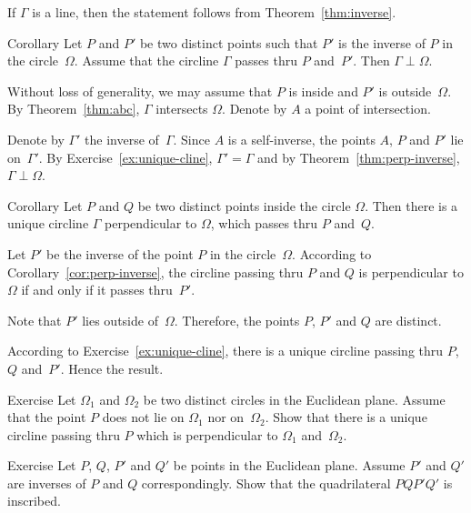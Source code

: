 If $\Gamma$ is a line, 
then the statement follows from Theorem~\ref{thm:inverse}.
\qeds


\begin{thm}{Corollary}\label{cor:perp-inverse}
Let $P$ and $P'$ be two distinct points
such that $P'$ is the inverse of $P$ in the circle~$\Omega$.
Assume that the circline $\Gamma$ passes thru $P$ and~$P'$.
Then $\Gamma\perp\Omega$.
\end{thm}

Without loss of generality, we may assume that $P$ is inside and $P'$ is outside~$\Omega$.
By Theorem~\ref{thm:abc}, $\Gamma$ intersects $\Omega$.
Denote by $A$ a point of intersection.


Denote by $\Gamma'$ the inverse of~$\Gamma$.
Since $A$ is a self-inverse, the points $A$, $P$ and $P'$ lie on~$\Gamma'$.
By Exercise~\ref{ex:unique-cline},
$\Gamma'=\Gamma$
and by Theorem~\ref{thm:perp-inverse}, $\Gamma\perp\Omega$.
\qeds

\begin{thm}{Corollary}\label{cor:h-line} 
Let $P$ and $Q$ be two distinct points inside the circle $\Omega$.
Then there is a unique circline $\Gamma$ perpendicular to $\Omega$, which passes thru $P$ and~$Q$.  
\end{thm}

Let $P'$ be the inverse of the point $P$ in the circle~$\Omega$.
According to Corollary~\ref{cor:perp-inverse},
the circline passing thru $P$ and $Q$ 
is perpendicular to $\Omega$ if and only if it passes thru~$P'$.

Note that $P'$ lies outside of~$\Omega$.
Therefore, the points $P$, $P'$ and $Q$ are distinct.

According to Exercise~\ref{ex:unique-cline},
there is a unique circline passing thru $P$, $Q$ and~$P'$.
Hence the result.
\qeds

\begin{thm}{Exercise}\label{ex:cline-perp-to-two}
Let $\Omega_1$ and $\Omega_2$ be two distinct circles in the Euclidean plane.
Assume that the point $P$ does not lie on $\Omega_1$ nor on~$\Omega_2$.
Show that there is a unique circline passing thru $P$ which is perpendicular to $\Omega_1$ and~$\Omega_2$.
\end{thm}

\begin{thm}{Exercise}\label{ex:inscribed+inv}
Let $P$, $Q$, $P'$ and $Q'$ be points in the Euclidean plane.
Assume $P'$ and $Q'$ are inverses of $P$ and $Q$ correspondingly.
Show that the quadrilateral $PQP'Q'$ is inscribed.
\end{thm}

